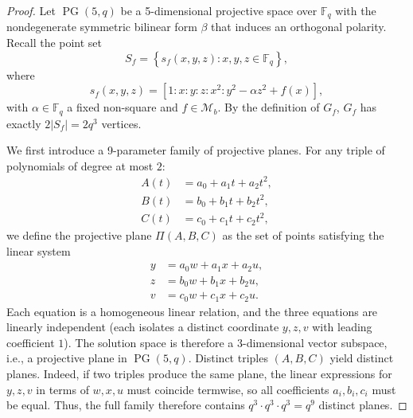 \documentclass[11pt,a4paper]{article}
\theoremstyle{definition}
\theoremstyle{remark}
\newcommand{\PG}{\operatorname{PG}}
\begin{document}
\begin{proof}
Let $\PG(5,q)$ be a 5-dimensional projective space  over $\mathbb{F}_q$  with the nondegenerate symmetric bilinear form $\beta$ that induces an orthogonal polarity. Recall the point set
\[
S_f = \left\{ s_f(x, y, z) : x, y, z \in \mathbb{F}_q \right\},
\]
where 
\[
s_f(x, y, z) = \left[ 1 : x : y : z : x^2 : y^2 - \alpha z^2 + f(x) \right],
\]
with $\alpha \in \mathbb{F}_q$ a fixed non-square and $f \in \mathcal{M}_b$. By the definition of  $G_f$, $G_f$ has exactly $2|S_f| = 2q^3$ vertices.

We first introduce a 9-parameter family of projective planes. 
For any triple of polynomials of degree at most $2$:
\[
\begin{aligned}
A(t) &= a_0 + a_1 t + a_2 t^2, \\
B(t) &= b_0 + b_1 t + b_2 t^2, \\
C(t) &= c_0 + c_1 t + c_2 t^2,
\end{aligned}
\]
we define the projective plane $\Pi(A,B,C)$ as the set of points satisfying the linear system
\[
\begin{aligned}\label{exKabK3b+1-equation7}
y &= a_0 w + a_1 x + a_2 u, \\
z &= b_0 w + b_1 x + b_2 u, \\
v &= c_0 w + c_1 x + c_2 u.
\end{aligned}
\]
Each equation is a homogeneous linear relation, and the three equations are linearly independent (each isolates a distinct coordinate $y,z,v$ with leading coefficient $1$). The solution space is therefore a $3$-dimensional vector subspace, i.e., a projective plane in $\PG(5,q)$.
Distinct triples $(A,B,C)$ yield distinct planes. Indeed, if two triples produce the same plane, the linear expressions for $y,z,v$ in terms of $w,x,u$ must coincide termwise, so all coefficients $a_i,b_i,c_i$ must be equal. Thus, the full family therefore contains $q^3 \cdot q^3 \cdot q^3 = q^9$ distinct planes.




\end{proof}
\end{document}
